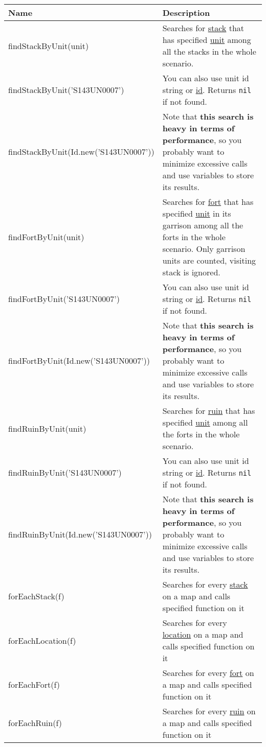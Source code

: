 \begin{center}
\begin{tabularx}{\linewidth}{| l | X |}
\hline
\textbf{Name} & \textbf{Description} \\
\hline
findStackByUnit(unit) & Searches for \hyperref[Stack]{stack} that has specified \hyperref[Unit]{unit} among all the stacks in the whole scenario.\\
findStackByUnit('S143UN0007') & You can also use unit id string or \hyperref[Id]{id}. Returns \texttt{nil} if not found.\\
findStackByUnit(Id.new('S143UN0007')) & Note that \textbf{this search is heavy in terms of performance}, so you probably want to minimize excessive calls and use variables to store its results.\\
\hline
findFortByUnit(unit) & Searches for \hyperref[Fort]{fort} that has specified \hyperref[Unit]{unit} in its garrison among all the forts in the whole scenario. Only garrison units are counted, visiting stack is ignored.\\
findFortByUnit('S143UN0007') & You can also use unit id string or \hyperref[Id]{id}. Returns \texttt{nil} if not found.\\
findFortByUnit(Id.new('S143UN0007')) & Note that \textbf{this search is heavy in terms of performance}, so you probably want to minimize excessive calls and use variables to store its results.\\
\hline
findRuinByUnit(unit) & Searches for \hyperref[Ruin]{ruin} that has specified \hyperref[Unit]{unit} among all the forts in the whole scenario.\\
findRuinByUnit('S143UN0007') & You can also use unit id string or \hyperref[Id]{id}. Returns \texttt{nil} if not found.\\
findRuinByUnit(Id.new('S143UN0007')) & Note that \textbf{this search is heavy in terms of performance}, so you probably want to minimize excessive calls and use variables to store its results.\\
\hline
forEachStack(f) & Searches for every \hyperref[Stack]{stack} on a map and calls specified function on it\\
\hline
forEachLocation(f) & Searches for every \hyperref[Location]{location} on a map and calls specified function on it\\
\hline
forEachFort(f) & Searches for every \hyperref[Fort]{fort} on a map and calls specified function on it\\
\hline
forEachRuin(f) & Searches for every \hyperref[Ruin]{ruin} on a map and calls specified function on it\\

\end{tabularx}
\end{center}
